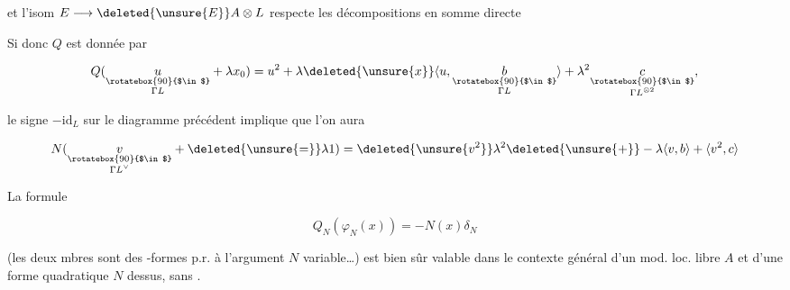 
et l'isom $E\longrightarrow\deleted{\unsure{E}}A\otimes L$ respecte les décompositions en somme directe


Si donc $Q$ est donnée par

\[
Q(\underset{\substack{\rotatebox{90}{$\in$}\\\Gamma L}}{u}+\lambda x_0)
=u^2+\lambda\deleted{\unsure{x}}\langle u,\underset{\substack{\rotatebox{90}{$\in$}\\\Gamma L}}{b}\rangle
+\lambda^2\underset{\substack{\rotatebox{90}{$\in$}\\\Gamma L^{\otimes2}}}{c},
\]

le signe $-\mathrm{id}_{L}$ sur le diagramme précédent implique que l'on aura

\[
N(\underset{\substack{\rotatebox{90}{$\in$}\\\Gamma L^\vee}}{v}+\deleted{\unsure{=}}\lambda 1)
=\deleted{\unsure{v^2}}\lambda^2\deleted{\unsure{+}}-\lambda\langle v,b\rangle+\langle v^{2},c\rangle
\]

La formule

\[
\boxed{Q_N(\varphi_N(x))=-N(x)\delta_N}
\]

(les deux mbres sont des -formes p.r. à l'argument $N$ variable\ldots) est bien sûr valable dans le contexte général d'un mod. loc. libre $A$  et d'une forme quadratique  $N$ dessus, sans .



